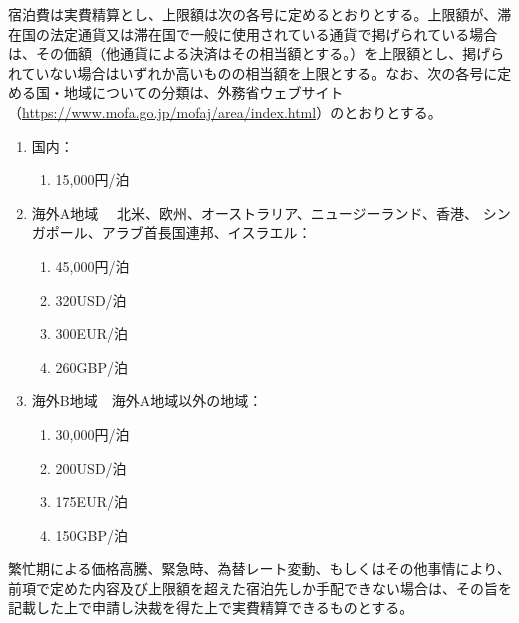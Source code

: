 \documentclass[10pt,a4paper,uplatex]{jsarticle}
\begin{document}
宿泊費は実費精算とし、上限額は次の各号に定めるとおりとする。上限額が、滞在国の法定通貨又は滞在国で一般に使用されている通貨で掲げられている場合は、その価額（他通貨による決済はその相当額とする。）を上限額とし、掲げられていない場合はいずれか高いものの相当額を上限とする。なお、次の各号に定める国・地域についての分類は、外務省ウェブサイト（\url{https://www.mofa.go.jp/mofaj/area/index.html}）のとおりとする。
\begin{enumerate}
    \item 国内：
    \begin{enumerate}
        \item 15,000円/泊
    \end{enumerate}
    \item 海外A地域 　北米、欧州、オーストラリア、ニュージーランド、香港、 シンガポール、アラブ首長国連邦、イスラエル：
    \begin{enumerate}
        \item 45,000円/泊
        \item 320USD/泊
        \item 300EUR/泊
        \item 260GBP/泊
    \end{enumerate}
    \item 海外B地域　海外A地域以外の地域：
    \begin{enumerate}
        \item 30,000円/泊
        \item 200USD/泊
        \item 175EUR/泊
        \item 150GBP/泊
    \end{enumerate}
\end{enumerate}
\term 繁忙期による価格高騰、緊急時、為替レート変動、もしくはその他事情により、前項で定めた内容及び上限額を超えた宿泊先しか手配できない場合は、その旨を記載した上で申請し決裁を得た上で実費精算できるものとする。
\end{document}
